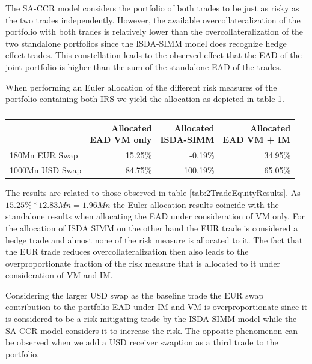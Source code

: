 \documentclass[../Thesis_AHoecherl.tex]{subfiles}
\begin{document}
    The SA-CCR model considers the portfolio of both trades to be just as risky as the two trades independently. However, the available overcollateralization of the portfolio with both trades is relatively lower than the overcollateralization of the two standalone portfolios since the ISDA-SIMM model does recognize hedge effect trades. This constellation leads to the observed effect that the EAD of the joint portfolio is higher than the sum of the standalone EAD of the trades.

    When performing an Euler allocation of the different risk measures of the portfolio containing both IRS we yield the allocation as depicted in table \ref{tab:2TradeRatesAllocation}.

    \begin{table}[htbp]
        \centering
        \begin{tabular}{l||r|r|r}
                & \makecell{Allocated \\ EAD VM only} & \makecell{Allocated \\ ISDA-SIMM} & \makecell{Allocated \\ EAD VM + IM} \\
                \toprule
        180Mn EUR Swap & 15.25\% & -0.19\% & 34.95\% \\
        1000Mn USD Swap & 84.75\% & 100.19\% & 65.05\% \\
        \end{tabular}%
        \caption{}
        \label{tab:2TradeRatesAllocation}%
    \end{table}%
    
    The results are related to those observed in table \ref{tab:2TradeEquityResults}. As $15.25\% * 12.83Mn = 1.96Mn$ the Euler allocation results coincide with the standalone results when allocating the EAD under consideration of VM only. 
    For the allocation of \gls{ISDA SIMM} on the other hand the EUR trade is considered a hedge trade and almost none of the risk measure is allocated to it. 
    The fact that the EUR trade reduces overcollateralization then also leads to the overproportionate fraction of the risk measure that is allocated to it under consideration of VM and IM.
    
    Considering the larger USD swap as the baseline trade the EUR swap contribution to the portfolio EAD under IM and VM is overproportionate since it is considered to be a risk mitigating trade by the \gls{ISDA SIMM} model while the SA-CCR model considers it to increase the risk. The opposite phenomenon can be observed when we add a USD receiver swaption as a third trade to the portfolio.
\end{document}

